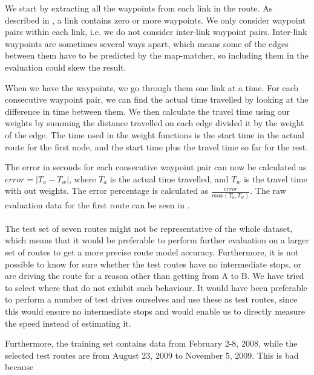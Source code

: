 We start by extracting all the waypoints from each link in the route. As described in , a link contains zero or more waypoints. We only consider waypoint pairs within each link, i.e. we do not consider inter-link waypoint pairs. Inter-link waypoints are sometimes several ways apart, which means some of the edges between them have to be predicted by the map-matcher, so including them in the evaluation could skew the result.

When we have the waypoints, we go through them one link at a time. For each consecutive waypoint pair, we can find the actual time travelled by looking at the difference in time between them. We then calculate the travel time using our weights by summing the distance travelled on each edge divided it by the weight of the edge. The time used in the weight functions is the start time in the actual route for the first node, and the start time plus the travel time so far for the rest.

The error in seconds for each consecutive waypoint pair can now be calculated as $error = |T_a - T_w|$, where $T_a$ is the actual time travelled, and $T_w$ is the travel time with out weights. The error percentage is calculated as $\frac{error}{max(T_a, T_w)}$. The raw evaluation data for the first route can be seen in .
\\\\
The test set of seven routes might not be representative of the whole dataset, which means that it would be preferable to perform further evaluation on a larger set of routes to get a more precise route model accuracy. Furthermore, it is not possible to know for sure whether the test routes have no intermediate stops, or are driving the route for a reason other than getting from A to B. We have tried to select where that do not exhibit such behaviour. It would have been preferable to perform a number of test drives ourselves and use these as test routes, since this would ensure no intermediate stops and would enable us to directly measure the speed instead of estimating it.

Furthermore, the training set contains data from February 2-8, 2008, while the selected test routes are from August 23, 2009 to November 5, 2009. This is bad because